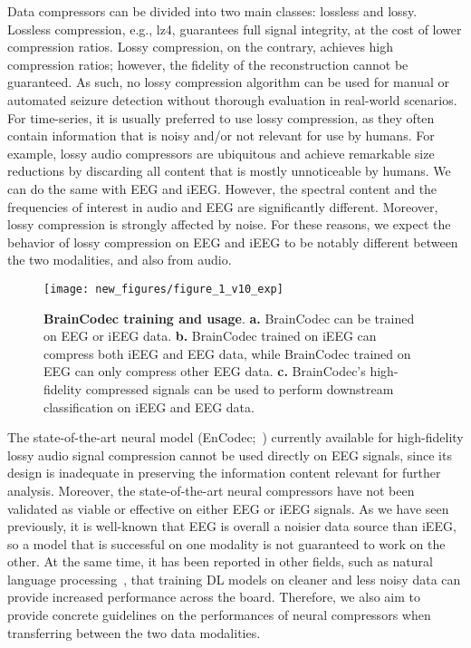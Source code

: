 \documentclass{article} %
\begin{document}
Data compressors can be divided into two main classes: lossless and lossy. 
Lossless compression, e.g., lz4, guarantees full signal integrity, at the cost of lower compression ratios. 
Lossy compression, on the contrary, achieves high compression ratios; however, the fidelity of the reconstruction cannot be guaranteed. 
As such, no lossy compression algorithm can be used for manual or automated seizure detection without thorough evaluation in real-world scenarios. 
For time-series, it is usually preferred to use lossy compression, as they often contain information that is noisy and/or not relevant for use by humans. 
For example, lossy audio compressors are ubiquitous and achieve remarkable size reductions by discarding all content that is mostly unnoticeable by humans. 
We can do the same with EEG and iEEG. However, the spectral content and the frequencies of interest in audio and EEG are significantly different. Moreover, lossy compression is strongly affected by noise. For these reasons, we expect the behavior of lossy compression on EEG and iEEG to be notably different between the two modalities, and also from audio.

\begin{figure}[t]
    \centering
    \texttt{[image: new\_figures/figure\_1\_v10\_exp]}
    \caption{\textbf{BrainCodec training and usage}. \textbf{a.} BrainCodec can be trained on EEG or iEEG data. \textbf{b.} BrainCodec trained on iEEG can compress both iEEG and EEG data, while BrainCodec trained on EEG can only compress other EEG data. \textbf{c.} BrainCodec's high-fidelity compressed signals can be used to perform downstream classification on iEEG and EEG data.}
    \label{fig:full_arch}
\end{figure}

The state-of-the-art neural model (EnCodec;~\cite{Defossez2023}) currently available for high-fidelity lossy audio signal compression cannot be used directly on EEG signals, since its design is inadequate in preserving the information content relevant for further analysis. 
Moreover, the state-of-the-art neural compressors have not been validated as viable or effective on either EEG or iEEG signals.
As we have seen previously, it is well-known that EEG is overall a noisier data source than iEEG, so a model that is successful on one modality is not guaranteed to work on the other.
At the same time, it has been reported in other fields, such as natural language processing~\citep{Lee2022a,Muennighoff2023,Gunasekar2023}, that training DL models on cleaner and less noisy data can provide increased performance across the board.
Therefore, we also aim to provide concrete guidelines on the performances of neural compressors when transferring between the two data modalities.
\end{document}
